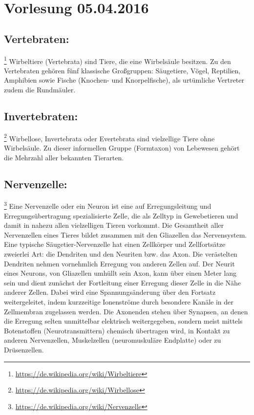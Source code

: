 \section{Vorlesung 05.04.2016}

\subsection{Vertebraten:}\footnote{\url{https://de.wikipedia.org/wiki/Wirbeltiere}} Wirbeltiere (Vertebrata) sind Tiere, die eine Wirbelsäule besitzen. Zu den Vertebraten gehören fünf klassische Großgruppen: Säugetiere, Vögel, Reptilien, Amphibien sowie Fische (Knochen- und Knorpelfische), als urtümliche Vertreter zudem die Rundmäuler.

\subsection{Invertebraten:}\footnote{\url{https://de.wikipedia.org/wiki/Wirbellose}} Wirbellose, Invertebrata oder Evertebrata sind vielzellige Tiere ohne Wirbelsäule. Zu dieser informellen Gruppe (Formtaxon) von Lebewesen gehört die Mehrzahl aller bekannten Tierarten.

\subsection{Nervenzelle:}\footnote{\url{https://de.wikipedia.org/wiki/Nervenzelle}} Eine Nervenzelle oder ein Neuron ist eine auf Erregungsleitung und Erregungsübertragung spezialisierte Zelle, die als Zelltyp in Gewebetieren und damit in nahezu allen vielzelligen Tieren vorkommt. Die Gesamtheit aller Nervenzellen eines Tieres bildet zusammen mit den Gliazellen das Nervensystem.\\
Eine typische Säugetier-Nervenzelle hat einen Zellkörper und Zellfortsätze zweierlei Art: die Dendriten und den Neuriten bzw. das Axon. Die verästelten Dendriten nehmen vornehmlich Erregung von anderen Zellen auf. Der Neurit eines Neurons, von Gliazellen umhüllt sein Axon, kann über einen Meter lang sein und dient zunächst der Fortleitung einer Erregung dieser Zelle in die Nähe anderer Zellen. Dabei wird eine Spannungsänderung über den Fortsatz weitergeleitet, indem kurzzeitige Ionenströme durch besondere Kanäle in der Zellmembran zugelassen werden.
Die Axonenden stehen über Synapsen, an denen die Erregung selten unmittelbar elektrisch weitergegeben, sondern meist mittels Botenstoffen (Neurotransmittern) chemisch übertragen wird, in Kontakt zu anderen Nervenzellen, Muskelzellen (neuromuskuläre Endplatte) oder zu Drüsenzellen.

